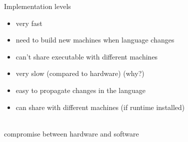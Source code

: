 \documentclass[10pt]{beamer}
\begin{document}
\begin{frame}{Implementation levels}
  \begin{itemize}
  \item very fast
  \item need to build new machines when language changes
  \item can't share executable with different machines
  \end{itemize}
  \bigskip
  \begin{itemize}
  \item very slow (compared to hardware) (why?)
  \item easy to propagate changes in the language
  \item can share with different machines (if runtime installed)
  \end{itemize}
  \bigskip
  \\
  compromise between hardware and software
\end{frame}
\end{document}

